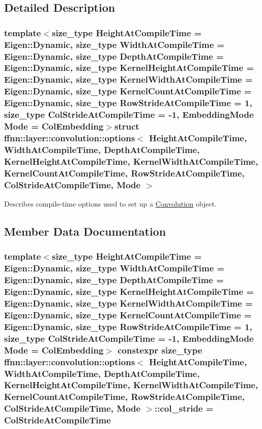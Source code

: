 \subsection{Detailed Description}
\subsubsection*{template$<$size\-\_\-type Height\-At\-Compile\-Time = Eigen\-::\-Dynamic, size\-\_\-type Width\-At\-Compile\-Time = Eigen\-::\-Dynamic, size\-\_\-type Depth\-At\-Compile\-Time = Eigen\-::\-Dynamic, size\-\_\-type Kernel\-Height\-At\-Compile\-Time = Eigen\-::\-Dynamic, size\-\_\-type Kernel\-Width\-At\-Compile\-Time = Eigen\-::\-Dynamic, size\-\_\-type Kernel\-Count\-At\-Compile\-Time = Eigen\-::\-Dynamic, size\-\_\-type Row\-Stride\-At\-Compile\-Time = 1, size\-\_\-type Col\-Stride\-At\-Compile\-Time = -\/1, Embedding\-Mode Mode = Col\-Embedding$>$struct ffnn\-::layer\-::convolution\-::options$<$ Height\-At\-Compile\-Time, Width\-At\-Compile\-Time, Depth\-At\-Compile\-Time, Kernel\-Height\-At\-Compile\-Time, Kernel\-Width\-At\-Compile\-Time, Kernel\-Count\-At\-Compile\-Time, Row\-Stride\-At\-Compile\-Time, Col\-Stride\-At\-Compile\-Time, Mode $>$}

Describes compile-\/time options used to set up a \hyperlink{classffnn_1_1layer_1_1_convolution}{Convolution} object. 

\subsection{Member Data Documentation}
\hypertarget{structffnn_1_1layer_1_1convolution_1_1options_a9f5dc60cb9493d65119fa087c63c0c93}{
\subsubsection[{col\-\_\-stride}]{\setlength{\rightskip}{0pt plus 5cm}template$<$size\-\_\-type Height\-At\-Compile\-Time = Eigen\-::\-Dynamic, size\-\_\-type Width\-At\-Compile\-Time = Eigen\-::\-Dynamic, size\-\_\-type Depth\-At\-Compile\-Time = Eigen\-::\-Dynamic, size\-\_\-type Kernel\-Height\-At\-Compile\-Time = Eigen\-::\-Dynamic, size\-\_\-type Kernel\-Width\-At\-Compile\-Time = Eigen\-::\-Dynamic, size\-\_\-type Kernel\-Count\-At\-Compile\-Time = Eigen\-::\-Dynamic, size\-\_\-type Row\-Stride\-At\-Compile\-Time = 1, size\-\_\-type Col\-Stride\-At\-Compile\-Time = -\/1, Embedding\-Mode Mode = Col\-Embedding$>$ constexpr {\bf size\-\_\-type} {\bf ffnn\-::layer\-::convolution\-::options}$<$ Height\-At\-Compile\-Time, Width\-At\-Compile\-Time, Depth\-At\-Compile\-Time, Kernel\-Height\-At\-Compile\-Time, Kernel\-Width\-At\-Compile\-Time, Kernel\-Count\-At\-Compile\-Time, Row\-Stride\-At\-Compile\-Time, Col\-Stride\-At\-Compile\-Time, Mode $>$\-::col\-\_\-stride = Col\-Stride\-At\-Compile\-Time\hspace{0.3cm}{\ttfamily [static]}}}\label{structffnn_1_1layer_1_1convolution_1_1options_a9f5dc60cb9493d65119fa087c63c0c93}


